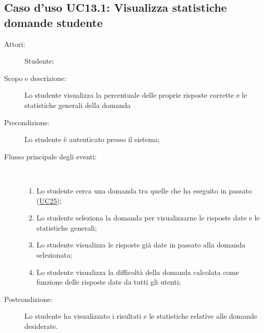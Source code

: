 \subsection{Caso d'uso UC13.1: Visualizza statistiche domande studente}\begin{description}
	\item[Attori:] Studente;
	\item[Scopo e descrizione:] Lo studente visualizza la percentuale delle proprie risposte corrette e le statistiche generali della domanda
	\item[Precondizione:] Lo studente è autenticato presso il sistema;
	
	\item[Flusso principale degli eventi:] \ 
	\begin{enumerate}
		\item Lo studente cerca una domanda tra quelle che ha eseguito in passato (\hyperlink{UC25}{UC25});
		\item Lo studente seleziona la domanda per visualizzarne le risposte date e le statistiche generali;
		\item Lo studente visualizza le risposte già date in passato alla domanda selezionata;
		\item Lo studente visualizza la difficoltà della domanda calcolata come funzione delle risposte date da tutti gli utenti;
		
	\end{enumerate}
	\item[Postcondizione:] Lo studente ha visualizzato i risultati e le statistiche relative alle domande desiderate.
\end{description}
\hypertarget{UC13.2}{}
